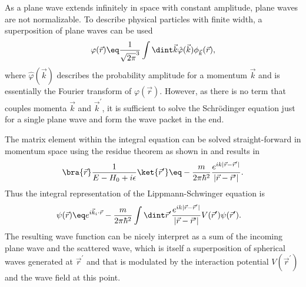 \documentclass[\main/dresen_thesis.tex]{subfiles}
\begin{document}
As a plane wave extends infinitely in space with constant amplitude, plane waves are not normalizable.
To describe physical particles with finite width, a superposition of plane waves can be used
\begin{align}
  \varphi(\vec{r}) \eq \frac{1}{\sqrt{2 \pi}^3} \int \dint \vec{k} \hat{\varphi} (\vec{k}) \phi_{\vec{k}}(\vec{r}),
\end{align}
where $\hat{\varphi} (\vec{k})$ describes the probability amplitude for a momentum $\vec{k}$ and is essentially the Fourier transform of $\varphi(\vec{r})$.
However, as there is no term that couples momenta $\vec{k}$ and $\vec{k}^\prime$, it is sufficient to solve the Schr\"odinger equation just for a single plane wave and form the wave packet in the end.

The matrix element within the integral equation  can be solved straight-forward in momentum space using the residue theorem as shown in  and results in
\begin{align}
  \bra{\vec{r}}\frac{1}{E - H_0 + i \epsilon} \ket{\vec{r}^\prime} \eq -\frac{m}{2 \pi \hbar^2} \frac{e^{ik|\vec{r} - \vec{r}^\prime|}}{|\vec{r} - \vec{r}^\prime|}.
\end{align}
Thus the integral representation of the Lippmann-Schwinger equation is
\begin{align}
  \psi (\vec{r}) &\eq e^{i\vec{k}_i \cdot \vec{r}} - \frac{m}{2 \pi\hbar^2} \int \dint \vec{r}^\prime \frac{e^{ik|\vec{r} - \vec{r}^\prime|}}{|\vec{r} - \vec{r}^\prime|} V (\vec{r}^\prime)\psi (\vec{r}^\prime).
\end{align}
The resulting wave function can be nicely interpret as a sum of the incoming plane wave and the scattered wave, which is itself a superposition of spherical waves generated at $\vec{r}^\prime$ and that is modulated by the interaction potential $V(\vec{r}^\prime)$ and the wave field at this point.
\end{document}

